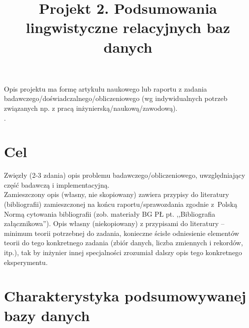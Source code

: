 \documentclass{classrep}
\author{
  \studentinfo{Hubert Gawłowski}{224298} \and
  \studentinfo{Kamil Kiszko-Zgierski}{224328} }
\title{Projekt 2.  Podsumowania lingwistyczne relacyjnych baz danych}
\begin{document}
\maketitle

Opis projektu ma formę artykułu naukowego lub raportu z zadania
badawczego/doświadczalnego/obliczeniowego (wg indywidualnych potrzeb związanych np. z
pracą inżynierską/naukową/zawodową). \\
. 

\section{Cel}
Zwięzły (2-3 zdania) opis
problemu badawczego/obliczeniowego, uwzględniający część badawczą i implementacyjną. \\
\indent Zamieszczony opis (własny, nie skopiowany) zawiera
przypisy do literatury (bibliografii) zamieszczonej na końcu raportu/sprawozdania
zgodnie z~Polską Normą cytowania bibliografii (zob. materiały BG PŁ pt. ,,Bibliografia
załącznikowa''). Opis własny (niekopiowany) z przypisami do literatury -- minimum
teorii potrzebnej do zadania, konieczne ścisłe odniesienie elementów teorii do tego konkretnego zadania (zbiór
danych, liczba zmiennych i rekordów, itp.), tak by inżynier innej specjalności zrozumiał dalszy
opis tego konkretnego eksperymentu. \\


\section{Charakterystyka podsumowywanej bazy danych}
\end{document}
